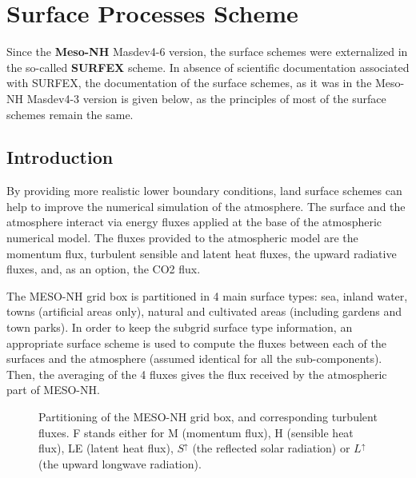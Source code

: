 
\chapter{Surface Processes Scheme}
\minitoc


Since the {\bf Meso-NH} Masdev4-6 version, the surface schemes were externalized
in the so-called {\bf SURFEX} scheme. In absence of scientific documentation
associated with SURFEX, the documentation of the surface schemes, as it was in the Meso-NH Masdev4-3 version is given below, as the principles of
most of the surface schemes remain the same.

\section{Introduction}


By providing more realistic
lower boundary conditions,
land surface schemes
can help to improve the numerical simulation
of the atmosphere.
The surface and the atmosphere
interact via energy fluxes applied at the base of the
atmospheric numerical model.
The fluxes provided to the atmospheric model
are the momentum flux, turbulent sensible and latent heat fluxes,
the upward radiative fluxes, and, as an option, the CO2 flux.

The MESO-NH grid box is partitioned in 4 main surface types:
sea, inland water, towns (artificial areas only),
natural and cultivated areas (including gardens and town parks).
In order to keep the subgrid surface type information,
an appropriate surface scheme is used to compute the fluxes
between each of the surfaces and the atmosphere
(assumed identical for all the sub-components).
Then, the averaging of the 4 fluxes gives
the flux received by the atmospheric part of MESO-NH.\\

\begin{figure}[h]
\hspace*{2.cm}
\caption{Partitioning of the MESO-NH grid box, and corresponding turbulent fluxes.
F stands either for M (momentum flux), H (sensible heat flux), LE (latent heat flux),
$S^\uparrow$ (the reflected solar radiation) or $L^\uparrow$ (the
upward longwave radiation).
\label{surf1}}
\end{figure}

